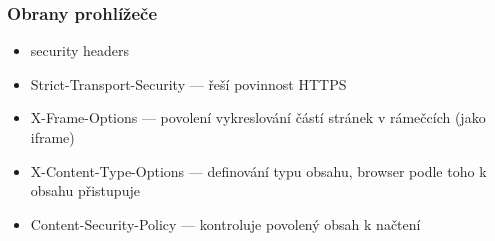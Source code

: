\subsubsection*{Obrany prohlížeče}
\begin{itemize}
    \item security headers
    \item Strict-Transport-Security --- řeší povinnost HTTPS
    \item X-Frame-Options --- povolení vykreslování částí stránek v rámečcích (jako iframe)
    \item X-Content-Type-Options --- definování typu obsahu, browser podle toho k obsahu přistupuje
    \item Content-Security-Policy --- kontroluje povolený obsah k načtení
\end{itemize}